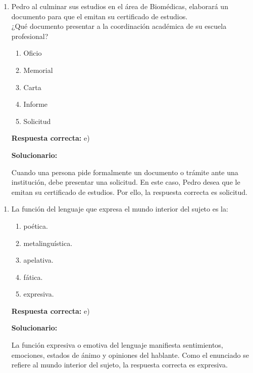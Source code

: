 \begin{enumerate}[resume]
	
	\item Pedro al culminar sus estudios en el área de Biomédicas, elaborará un documento para que el emitan su certificado de estudios.\\
	¿Qué documento presentar a la coordinación académica de su escuela profesional?
	
	\begin{enumerate}[label=\alph*)]
		\item Oficio
		\item Memorial
		\item Carta
		\item Informe
		\item Solicitud
	\end{enumerate}
	
	\textbf{Respuesta correcta:} e)
	
	\vspace{2mm}
	\textbf{Solucionario:}
	
	Cuando una persona pide formalmente un documento o trámite ante una institución, debe presentar una solicitud. En este caso, Pedro desea que le emitan su certificado de estudios. Por ello, la respuesta correcta es solicitud.
	
\end{enumerate}


\begin{enumerate}[resume]
	
	\item La función del lenguaje que expresa el mundo interior del sujeto es la:
	
	\begin{enumerate}[label=\alph*)]
		\item poética.
		\item metalinguística.
		\item apelativa.
		\item fática.
		\item expresiva.
	\end{enumerate}
	
	\textbf{Respuesta correcta:} e)
	
	\vspace{2mm}
	\textbf{Solucionario:}
	
	La función expresiva o emotiva del lenguaje manifiesta sentimientos, emociones, estados de ánimo y opiniones del hablante. Como el enunciado se refiere al mundo interior del sujeto, la respuesta correcta es expresiva.
	
\end{enumerate}


